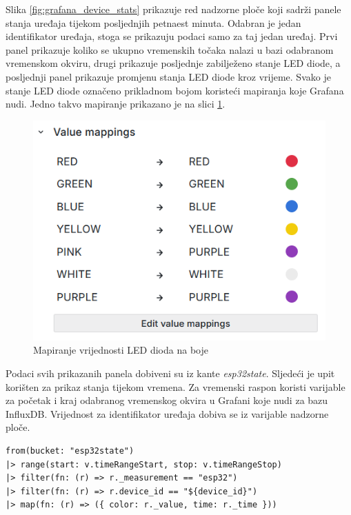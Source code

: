 Slika \ref{fig:grafana_device_stats} prikazuje red nadzorne ploče koji sadrži panele stanja uređaja tijekom posljednjih petnaest minuta. Odabran je jedan identifikator uređaja, stoga se prikazuju podaci samo za taj jedan uređaj. Prvi panel prikazuje koliko se ukupno vremenskih točaka nalazi u bazi odabranom vremenskom okviru, drugi prikazuje posljednje zabilježeno stanje LED diode, a posljednji panel prikazuje promjenu stanja LED diode kroz vrijeme. Svako je stanje LED diode označeno prikladnom bojom koristeći mapiranja koje Grafana nudi. Jedno takvo mapiranje prikazano je na slici \ref{fig:grafana_value_mapping}. 

\begin{figure}[ht]
	\centering
	\includegraphics[scale=0.6]{imgs/grafana_value_mapping}
	\caption{Mapiranje vrijednosti LED dioda na boje}
	\label{fig:grafana_value_mapping}
\end{figure}

Podaci svih prikazanih panela dobiveni su iz kante \textit{esp32state}. Sljedeći je upit korišten za prikaz stanja tijekom vremena. Za vremenski raspon koristi varijable za početak i kraj odabranog vremenskog okvira u Grafani koje nudi  za bazu InfluxDB. Vrijednost za identifikator uređaja dobiva se iz varijable nadzorne ploče. 

\begin{lstlisting}[caption={Upit za dohvat stanja LED diode u vremenskom okviru}, language=flux]
from(bucket: "esp32state")
|> range(start: v.timeRangeStart, stop: v.timeRangeStop)
|> filter(fn: (r) => r._measurement == "esp32")
|> filter(fn: (r) => r.device_id == "${device_id}")
|> map(fn: (r) => ({ color: r._value, time: r._time }))
\end{lstlisting}

